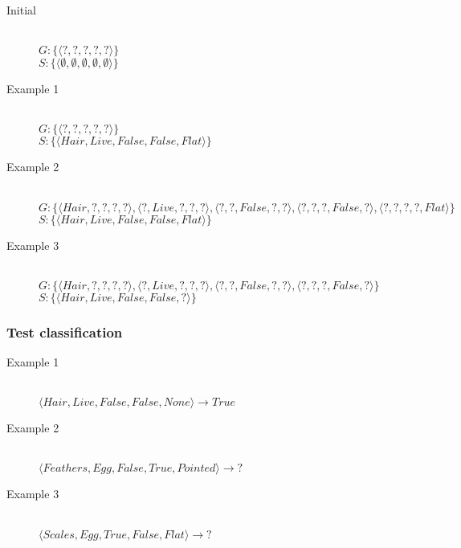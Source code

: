 \documentclass[11pt,a4paper]{article}
\begin{document}
        \begin{description}
          \item[Initial] \hfill \\
            $G: \lbrace \langle ?, ?, ?, ?, ? \rangle \rbrace$ \\
            $S: \lbrace \langle \emptyset, \emptyset, \emptyset, \emptyset, \emptyset \rangle \rbrace$
          \item[Example 1] \hfill \\
            $G: \lbrace \langle ?, ?, ?, ?, ? \rangle \rbrace$ \\
            $S: \lbrace \langle Hair, Live, False, False, Flat \rangle \rbrace$
          \item[Example 2] \hfill \\
            $G: \lbrace \langle Hair, ?, ?, ?, ? \rangle, \langle ?, Live, ?, ?, ? \rangle, \langle ?, ?, False, ?, ? \rangle, \langle ?, ?, ?, False, ? \rangle, \langle ?, ?, ?, ?, Flat \rangle \rbrace$ \\
            $S: \lbrace \langle Hair, Live, False, False, Flat \rangle \rbrace$
          \item[Example 3] \hfill \\
            $G: \lbrace \langle Hair, ?, ?, ?, ? \rangle, \langle ?, Live, ?, ?, ? \rangle, \langle ?, ?, False, ?, ? \rangle, \langle ?, ?, ?, False, ? \rangle \rbrace$ \\
            $S: \lbrace \langle Hair, Live, False, False, ? \rangle \rbrace$
        \end{description}
      
      \subsubsection*{Test classification}
      
        \begin{description}
          \item[Example 1] \hfill \\
            $\langle Hair, Live, False, False, None \rangle \rightarrow True$
          \item[Example 2] \hfill \\
            $\langle Feathers, Egg, False, True, Pointed \rangle \rightarrow \text{?}$
          \item[Example 3] \hfill \\
            $\langle Scales, Egg, True, False, Flat \rangle \rightarrow \text{?}$
        \end{description}
    
\end{document}
